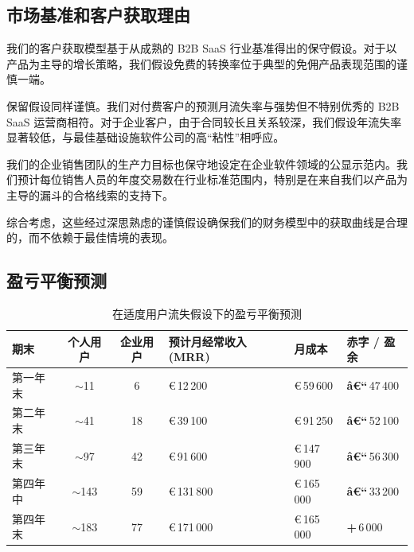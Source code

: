 \documentclass[11pt, a4paper, oneside]{article}
\begin{document}
\subsection{市场基准和客户获取理由}

我们的客户获取模型基于从成熟的 B2B SaaS 行业基准得出的保守假设。对于以产品为主导的增长策略，我们假设免费的转换率位于典型的免佣产品表现范围的谨慎一端。

保留假设同样谨慎。我们对付费客户的预测月流失率与强势但不特别优秀的 B2B SaaS 运营商相符。对于企业客户，由于合同较长且关系较深，我们假设年流失率显著较低，与最佳基础设施软件公司的高“粘性”相呼应。

我们的企业销售团队的生产力目标也保守地设定在企业软件领域的公显示范内。我们预计每位销售人员的年度交易数在行业标准范围内，特别是在来自我们以产品为主导的漏斗的合格线索的支持下。

综合考虑，这些经过深思熟虑的谨慎假设确保我们的财务模型中的获取曲线是合理的，而不依赖于最佳情境的表现。



\subsection{盈亏平衡预测}

\begin{table}[H]
\centering
\caption{在适度用户流失假设下的盈亏平衡预测}
\label{tab:break_even_moderate_churn}
\begin{tabularx}{\textwidth}{@{}l c c >{\raggedleft\arraybackslash}X
                                    >{\raggedleft\arraybackslash}X
                                    >{\raggedleft\arraybackslash}X@{}}
\toprule
\textbf{期末} &
\textbf{个人用户} &
\textbf{企业用户} &
\textbf{预计月经常收入 (MRR)} &
\textbf{月成本} &
\textbf{赤字 / 盈余} \\
\midrule
第一年末  & $\sim$11  & 6  & \euro{}\,12\,200  & \euro{}\,59\,600  & \textbf{â€“}\,47\,400 \\
第二年末  & $\sim$41  & 18 & \euro{}\,39\,100  & \euro{}\,91\,250  & \textbf{â€“}\,52\,100 \\
第三年末  & $\sim$97  & 42 & \euro{}\,91\,600  & \euro{}\,147\,900 & \textbf{â€“}\,56\,300 \\
第四年中  & $\sim$143 & 59 & \euro{}\,131\,800 & \euro{}\,165\,000 & \textbf{â€“}\,33\,200 \\
第四年末  & $\sim$183 & 77 & \euro{}\,171\,000 & \euro{}\,165\,000 & \textbf{+}\,6\,000  \\
\bottomrule
\end{tabularx}
\end{table}
\end{document}
